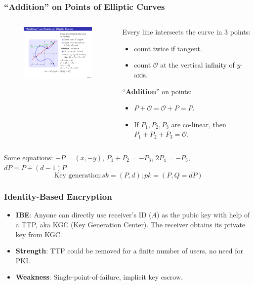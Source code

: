 \begin{frame}\frametitle{``Addition'' on Points of Elliptic Curves}
\begin{columns}
\begin{column}{5cm}
\begin{figure}
\begin{center}
%
\includegraphics[width=50mm]{pic/ecc.pdf} 
\end{center}
\end{figure}
\end{column}
\begin{column}{5cm}
Every line intersects the curve in 3 points:
\begin{itemize}
\item count twice if tangent.
\item count $\mathcal{O}$ at the vertical infinity of $y$-axis.
\end{itemize}
``\textbf{Addition}'' on points:
\begin{itemize}
\item $P+\mathcal{O} = \mathcal{O} + P = P$.
\item If $P_1, P_2, P_3$ are co-linear, then $P_1 + P_2 + P_3 = \mathcal{O}$.
\end{itemize}
\end{column}
\end{columns}
Some equations: \newline
$-P=(x,-y)$, $P_1 + P_2 = -P_3$, $2P_4=-P_3$, $dP = P + (d-1)P$
\[\text{Key generation:} sk = (P,d); pk = (P,Q=dP)\]
\end{frame}
\begin{frame}\frametitle{Identity-Based Encryption}
\begin{itemize}
\item \textbf{IBE}: Anyone can directly use receiver's ID ($A$) as the pubic key with help of a TTP, aka KGC (Key Generation Center). The receiver obtains its private key from KGC.
\item \textbf{Strength}: TTP could be removed for a finite number of users, no need for PKI.
\item \textbf{Weakness}: Single-point-of-failure, implicit key escrow.
\end{itemize}
\begin{figure}
\begin{center}

\end{center}
\end{figure}
\end{frame}
